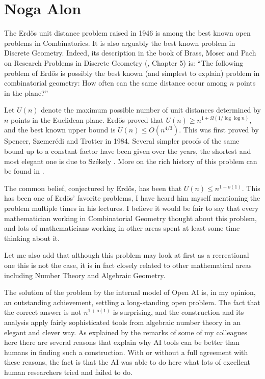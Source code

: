 \documentclass[11pt,reqno]{amsart}
\numberwithin{equation}{section}
\theoremstyle{definition}
\theoremstyle{remark}
\begin{document}
\section{Noga Alon}
The Erd\H{o}s unit distance problem \cite{Erdos1946SetsDistances} raised in 1946 
is among the best known open problems
in Combinatorics. It is also arguably the best known problem in 
Discrete Geometry. Indeed, its description in the book of Brass, Moser
and Pach on Research Problems in Discrete Geometry (\cite{BrassMoserPach2005}, Chapter 5)
is:
``The following problem of Erd\H{o}s \cite{Erdos1946SetsDistances} is possibly the best
known (and simplest to explain) problem in combinatorial geometry:
How often can the same distance occur among $n$ points in the plane?''

Let $U(n)$ denote the maximum possible number of unit distances 
determined by $n$ points in the Euclidean plane. Erd\H{o}s
proved that $U(n) \geq n^{1+\Omega(1/\log \log n)}$, and the best
known upper bound is $U(n) \leq O(n^{4/3})$. This was first proved by
Spencer, Szemer\'{e}di and Trotter \cite{SpencerSzemerediTrotter1984UnitDistances} in 1984. Several simpler
proofs of the same bound up to a constant factor 
have been given over the years, the shortest and most elegant one
is due to Sz\'{e}kely \cite{Szekely1997CrossingNumbers}.
More on the rich history of this problem can be found
in \cite{BrassMoserPach2005}. 

The common belief, conjectured by 
Erd\H{o}s, has been that $U(n) \leq n^{1+o(1)}$.
This has been one of Erd\H{o}s' favorite problems, I have heard
him myself mentioning the problem multiple times in his
lectures. 
I believe it would be fair to say that every mathematician working in 
Combinatorial Geometry thought about this 
problem, and lots of mathematicians working in other areas spent
at least some time thinking about it.

Let me also add that although this problem may look at first as 
a recreational one this is not the case,
it is in fact closely related to other 
mathematical areas including Number Theory and Algebraic Geometry.

The solution of the problem by the internal model of Open AI is,
in my opinion, an outstanding achievement, settling a long-standing
open problem. The fact that the correct answer is not $n^{1+o(1)}$
is surprising, and the construction and its analysis apply 
fairly sophisticated tools
from algebraic number theory in an elegant and clever way. 
As explained by the remarks of some of my colleagues here there 
are several reasons that 
explain why AI tools can be better than humans in finding such
a construction. With or without a full agreement with these reasons,
the fact is that the AI was able to do here what lots of excellent
human researchers tried and failed to do.
\end{document}
